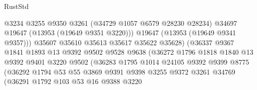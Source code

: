 \begin{lexlean}{RustStd}
\begin{coremodule}
                                      @3234
                                      @3255
                                      @9350
                                      @3261
                                      (@34729 @1057 @6579 @28230 @28234)
                                      @34697
                                      @19647
                                      (@13953 (@19649 @9351 @3220)))
                                    @19647
                                    (@13953 (@19649 @9341 @9357)))
                                  @35607
                                  @35610
                                  @35613
                                  @35617
                                  @35622
                                  @35628)
                                (@36337
                                  @9367
                                  @1841
                                  @1893
                                  @13
                                  @9392
                                  @9502
                                  @9528
                                  @9638
                                  (@36272
                                    @1796
                                    @1818
                                    @1840
                                    @13
                                    @9392
                                    @9401
                                    @3220
                                    @9502
                                    (@36283
                                      @1795
                                      @1014
                                      @24105
                                      @9392
                                      @9399
                                      @8775
                                      (@36292
                                        @1794
                                        @53
                                        @55
                                        @3869
                                        @9391
                                        @9398
                                        @3255
                                        @9372
                                        @3261
                                        @34769
                                        (@36291
                                          @1792
                                          @103
                                          @53
                                          @16
                                          @9388
                                          @3220

\end{coremodule}
\end{lexlean}
